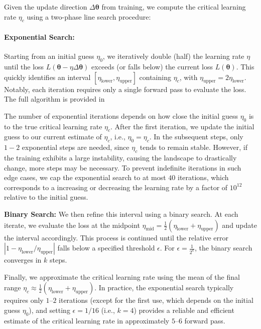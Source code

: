 \documentclass[]{fairmeta}
\theoremstyle{plain}
\theoremstyle{definition}
\begin{document}
Given the update direction $\Delta \bm{\theta}$ from training, we compute the critical learning rate $\eta_c$ using a two-phase line search procedure:

\paragraph{\textbf{Exponential Search:}} Starting from an initial guess $\eta_0$, we iteratively double (half) the learning rate $\eta$ until the loss $L(\bm{\theta} - \eta \Delta \bm{\theta})$ exceeds (or falls below) the current loss $L(\bm{\theta})$. This quickly identifies an interval $[\eta_{\text{lower}}, \eta_{\text{upper}}]$ containing $\eta_c$, with $\eta_{\text{upper}} = 2 \eta_{\text{lower}}$. Notably, each iteration requires only a single forward pass to evaluate the loss. The full algorithm is provided in 

The number of exponential iterations depends on how close the initial guess $\eta_0$ is to the true critical learning rate $\eta_c$. After the first iteration, we update the initial guess to our current estimate of $\eta_c$, i.e., $\eta_0 = \eta_c$. In the subsequent steps, only $1-2$ exponential steps are needed, since $\eta_c$ tends to remain stable. However, if the training exhibits a large instability, causing the landscape to drastically change, more steps may be necessary.
To prevent indefinite iterations in such edge cases, we cap the exponential search to at most $40$ iterations, which corresponds to a increasing or decreasing the learning rate by a factor of $10^{12}$ relative to the initial guess. 

    
\textbf{Binary Search:} We then refine this interval using a binary search. At each iterate, we evaluate the loss at the midpoint $\eta_{\text{mid}} = \frac{1}{2}(\eta_{\text{lower}} + \eta_{\text{upper}})$ and update the interval accordingly. This process is continued until the relative error $|1 - \eta_{\text{lower}}/ \eta_{\text{upper}}|$ falls below a specified threshold $\epsilon$. For $\epsilon = \frac{1}{2^k}$, the binary search converges in $k$ steps. 

Finally, we approximate the critical learning rate using the mean of the final range $\eta_c \approx \frac{1}{2}(\eta_{\text{lower}} + \eta_{\text{upper}})$.
In practice, the exponential search typically requires only $1$–$2$ iterations (except for the first use, which depends on the initial guess $\eta_0$), and setting $\epsilon = 1/16$ (i.e., $k=4$) provides a reliable and efficient estimate of the critical learning rate in approximately $5$–$6$ forward pass. 
\end{document}
